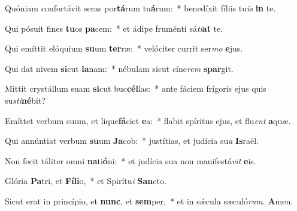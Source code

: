 ﻿\item Quóniam confortávit seras por\textbf{tá}rum tu\textbf{á}rum:~* benedíxit fíliis tu\textit{is} \textbf{in} te.
\item Qui pósuit fines \textbf{tu}os \textbf{pa}cem:~* et ádipe fruménti sá\textit{ti}\textbf{at} te.
\item Qui emíttit elóquium \textbf{su}um \textbf{ter}ræ:~* velóciter currit ser\textit{mo} \textbf{e}jus.
\item Qui dat nivem \textbf{si}cut \textbf{la}nam:~* nébulam sicut cíne\textit{rem} \textbf{spar}git.
\item Mittit crystállum suam \textbf{si}cut buc\textbf{cél}las:~* ante fáciem frígoris ejus quis su\textit{sti}\textbf{né}bit?
\item Emíttet verbum suum, et lique\textbf{fá}ciet \textbf{e}a:~* flabit spíritus ejus, et flu\textit{ent} \textbf{a}quæ.
\item Qui annúntiat verbum \textbf{su}um \textbf{Ja}cob:~* justítias, et judícia su\textit{a} \textbf{Is}raël.
\item Non fecit táliter omni \textbf{na}ti\textbf{ó}ni:~* et judícia sua non manifestá\textit{vit} \textbf{e}is.
\item Glória \textbf{Pa}tri, et \textbf{Fí}\textbf{li}o,~* et Spirítu\textit{i} \textbf{San}cto.
\item Sicut erat in princípio, et \textbf{nunc}, et \textbf{sem}per,~* et in sǽcula sæculó\textit{rum}. \textbf{A}men.
